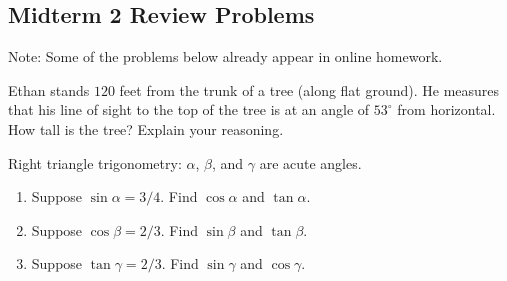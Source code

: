 \subsection{Midterm 2 Review Problems}
Note: Some of the problems below already appear in online homework.

\begin{prob}
Ethan stands $120$ feet from the trunk of a tree (along flat ground).  He measures that his line of sight to the top of the tree is at an angle of $53^\circ$ from horizontal.  How tall is the tree?  Explain your reasoning.  
\end{prob}

%
%


\begin{prob}
Right triangle trigonometry: $\alpha$, $\beta$, and $\gamma$ are acute angles.  
\begin{enumerate}
\item Suppose $\sin\alpha = 3/4$.  Find $\cos\alpha$ and $\tan\alpha$.
\item Suppose $\cos\beta = 2/3$.  Find $\sin\beta$ and $\tan\beta$.
\item Suppose $\tan\gamma = 2/3$.  Find $\sin\gamma$ and $\cos\gamma$.
\end{enumerate}
\end{prob}

